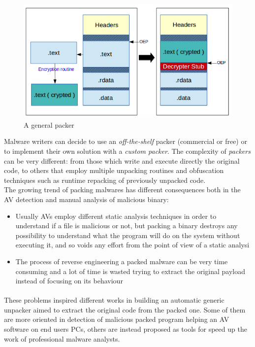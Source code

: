 \begin{figure}[!ht]
	\begin{center}
   		\includegraphics[width=\textwidth]{pictures/packer_general.png}
	\end{center}
	\caption{A general packer}
\end{figure}
Malware writers can decide to use an \textit{off-the-shelf} packer (commercial or free) or to implement their own solution with a \textit{custom packer}. The complexity of \textit{packers} can be very different: from those which write and execute directly the original code, to others that employ multiple unpacking routines and obfuscation techniques such as runtime repacking of previously unpacked code.\\
The growing trend of packing malwares has different consequences both in the \ac{AV} detection and manual analysis of malicious binary:
\begin{itemize}
\item Usually \acp{AV} employ different static analysis techniques in order to understand if a file is malicious or not, but packing a binary destroys any possibility to understand what the program will do on the system without executing it, and so voids any effort from the point of view of a static analysi
\item The process of reverse engineering a packed malware can be very time consuming and a lot of time is wasted trying to extract the original payload instead of focusing on its behaviour
\end{itemize}
\paragraph{}
These problems inspired different works in building an automatic generic unpacker aimed to extract the original code from the packed one. Some of them are more oriented in detection of malicious packed program helping an \ac{AV} software on end users PCs, others are instead proposed as tools for speed up the work of professional malware analysts.
